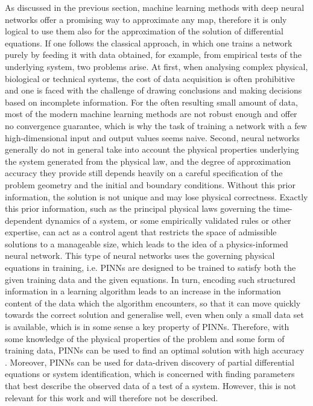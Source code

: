 As discussed in the previous section, machine learning methods with deep neural networks offer a promising way to approximate any map, therefore it is only logical to use them also for the approximation of the solution of differential equations. If one follows the classical approach, in which one trains a network purely by feeding it with data obtained, for example, from empirical tests of the underlying system, two problems arise. At first, when analysing complex physical, biological or technical systems, the cost of data acquisition is often prohibitive and one is faced with the challenge of drawing conclusions and making decisions based on incomplete information. For the often resulting small amount of data, most of the modern machine learning methods are not robust enough and offer no convergence guarantee, which is why the task of training a network with a few high-dimensional input and output values seems naive. Second, neural networks generally do not in general take into account the physical properties underlying the system generated from the physical law, and the degree of approximation accuracy they provide still depends heavily on a careful specification of the problem geometry and the initial and boundary conditions. Without this prior information, the solution is not unique and may lose physical correctness. Exactly this prior information, such as the principal physical laws governing the time-dependent dynamics of a system, or some empirically validated rules or other expertise, can act as a control agent that restricts the space of admissible solutions to a manageable size, which leads to the idea of a physics-informed neural network. This type of neural networks uses the governing physical equations in training, i.e. PINNs are designed to be trained to satisfy both the given training data and the given equations. In turn, encoding such structured information in a learning algorithm leads to an increase in the information content of the data which the algorithm encounters, so that it can move quickly towards the correct solution and generalise well, even when only a small data set is available, which is in some sense a key property of PINNs. Therefore, with some knowledge of the physical properties of the problem and some form of training data, PINNs can be used to find an optimal solution with high accuracy \cite{RaissiPerdikarisKarniadakisPart1:2017}. Moreover, PINNs can be used for data-driven discovery of partial differential equations or system identification, which is concerned with finding parameters that best describe the observed data of a test of a system. However, this is not relevant for this work and will therefore not be described. \\

